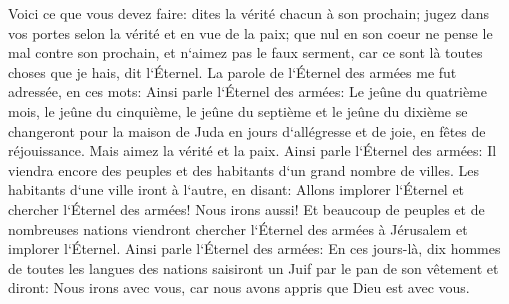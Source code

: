 \verse Voici ce que vous devez faire: dites la vérité chacun à son prochain; jugez dans vos portes selon la vérité et en vue de la paix; 
\verse que nul en son coeur ne pense le mal contre son prochain, et n`aimez pas le faux serment, car ce sont là toutes choses que je hais, dit l`Éternel. 
\verse La parole de l`Éternel des armées me fut adressée, en ces mots: 
\verse Ainsi parle l`Éternel des armées: Le jeûne du quatrième mois, le jeûne du cinquième, le jeûne du septième et le jeûne du dixième se changeront pour la maison de Juda en jours d`allégresse et de joie, en fêtes de réjouissance. Mais aimez la vérité et la paix. 
\verse Ainsi parle l`Éternel des armées: Il viendra encore des peuples et des habitants d`un grand nombre de villes. 
\verse Les habitants d`une ville iront à l`autre, en disant: Allons implorer l`Éternel et chercher l`Éternel des armées! Nous irons aussi! 
\verse Et beaucoup de peuples et de nombreuses nations viendront chercher l`Éternel des armées à Jérusalem et implorer l`Éternel. 
\verse Ainsi parle l`Éternel des armées: En ces jours-là, dix hommes de toutes les langues des nations saisiront un Juif par le pan de son vêtement et diront: Nous irons avec vous, car nous avons appris que Dieu est avec vous. 

